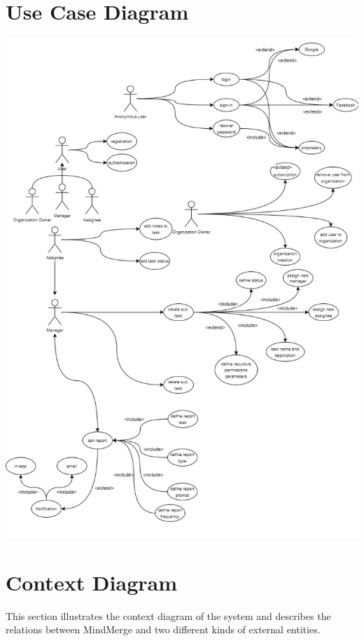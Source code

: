 \documentclass{article}
\begin{document}
\section{Use Case Diagram}
\includegraphics[width=\textwidth,height=\textheight,keepaspectratio]{images/UseCaseDiagram.jpg}

\section{Context Diagram}
This section illustrates the context diagram of the system and describes the relations between MindMerge and two different kinds of external entities.
\end{document}
